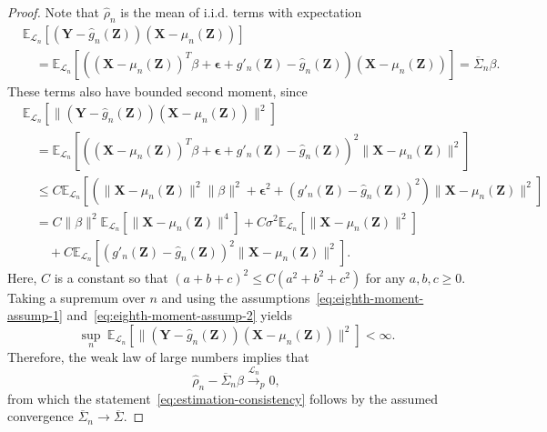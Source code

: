 \documentclass[12pt]{article}
\theoremstyle{definition}
\theoremstyle{remark}
\newcommand{\prx}{\bm X}
\newcommand{\prz}{\bm Z}
\newcommand{\pry}{{\bm Y}}
\newcommand{\peps}{\bm \epsilon}
\begin{document}
\begin{proof}

Note that $\widehat \rho_n$ is the mean of i.i.d. terms with expectation 
\begin{equation}
	\begin{split}
		&\mathbb E_{\mathcal L_n}[(\pry - \widehat g_n(\prz))(\prx - \mu_n(\prz))]  \\
		&\quad = \mathbb E_{\mathcal L_n}[((\prx - \mu_n(\prz))^T\beta + \peps + g'_n(\prz) - \widehat g_n(\prz))(\prx - \mu_n(\prz))] = \overline \Sigma_n \beta.
	\end{split}
\end{equation}
These terms also have bounded second moment, since
\begin{equation}
	\begin{split}
		&\mathbb E_{\mathcal L_n}[\|(\pry - \widehat g_n(\prz))(\prx - \mu_n(\prz))\|^2] \\
		&\quad= 	
		\mathbb E_{\mathcal L_n}[((\prx - \mu_n(\prz))^T\beta + \peps + g'_n(\prz) - \widehat g_n(\prz))^2\|\prx - \mu_n(\prz)\|^2] \\
		&\quad\leq
		C\mathbb E_{\mathcal L_n}[(\|\prx - \mu_n(\prz)\|^2\|\beta\|^2 + \peps^2 + (g'_n(\prz) - \widehat g_n(\prz))^2)\|\prx - \mu_n(\prz)\|^2] \\
		&\quad=
		C\|\beta\|^2\mathbb E_{\mathcal L_n}[\|\prx - \mu_n(\prz)\|^4] + C\sigma^2\mathbb E_{\mathcal L_n}[\|\prx - \mu_n(\prz)\|^2] \\
		&\quad \quad + C\mathbb E_{\mathcal L_n}[(g'_n(\prz) - \widehat g_n(\prz))^2\|\prx - \mu_n(\prz)\|^2].
	\end{split}
\end{equation}	
Here, $C$ is a constant so that $(a+b+c)^2 \leq C(a^2 + b^2 + c^2)$ for any $a, b, c \geq 0$.
Taking a supremum over $n$ and using the assumptions~\eqref{eq:eighth-moment-assump-1} and~\eqref{eq:eighth-moment-assump-2} yields
\begin{equation}
	\sup_n\ \mathbb E_{\mathcal L_n}[\|(\pry - \widehat g_n(\prz))(\prx - \mu_n(\prz))\|^2] < \infty.
\end{equation}
Therefore, the weak law of large numbers implies that
\begin{equation}
	\widehat \rho_n - \overline \Sigma_n \beta \overset{\mathcal L_n}\rightarrow _p  0,
\end{equation}
from which the statement~\eqref{eq:estimation-consistency} follows by the assumed convergence $\overline \Sigma_n \rightarrow \overline \Sigma$. 
	
\end{proof}
\end{document}
